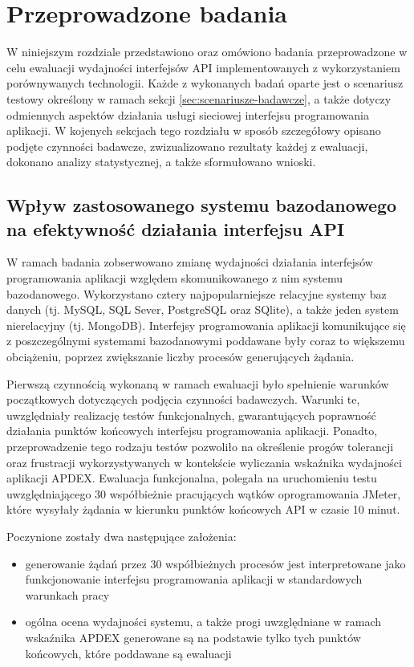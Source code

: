 \chapter{Przeprowadzone badania}
W niniejszym rozdziale przedstawiono oraz omówiono badania przeprowadzone w celu ewaluacji wydajności interfejsów API implementowanych z wykorzystaniem porównywanych technologii. Każde z wykonanych badań oparte jest o scenariusz testowy określony w ramach sekcji \ref{sec:scenariusze-badawcze}, a także dotyczy odmiennych aspektów działania usługi sieciowej interfejsu programowania aplikacji. W kojenych sekcjach tego rozdziału w sposób szczegółowy opisano podjęte czynności badawcze, zwizualizowano rezultaty każdej z ewaluacji, dokonano analizy statystycznej, a także sformułowano wnioski.

\section{Wpływ zastosowanego systemu bazodanowego na efektywność działania interfejsu API}
W ramach badania zobserwowano zmianę wydajności działania interfejsów programowania aplikacji względem skomunikowanego z nim systemu bazodanowego. Wykorzystano cztery najpopularniejsze relacyjne systemy baz danych (tj. MySQL, SQL Sever, PostgreSQL oraz SQlite), a także jeden system nierelacyjny (tj. MongoDB). Interfejsy programowania aplikacji komunikujące się z poszczególnymi systemami bazodanowymi poddawane były coraz to większemu obciążeniu, poprzez zwiększanie liczby procesów generujących żądania.

Pierwszą czynnością wykonaną w ramach ewaluacji było spełnienie warunków początkowych dotyczących podjęcia czynności badawczych. Warunki te, uwzględniały realizację testów funkcjonalnych, gwarantujących poprawność działania punktów końcowych interfejsu programowania aplikacji. Ponadto, przeprowadzenie tego rodzaju testów pozwoliło na określenie progów tolerancji oraz frustracji wykorzystywanych w kontekście wyliczania wskaźnika wydajności aplikacji APDEX. Ewaluacja funkcjonalna, polegała na uruchomieniu testu uwzględniającego 30 współbieżnie pracujących wątków oprogramowania JMeter, które wysyłały żądania w kierunku punktów końcowych API w czasie 10 minut.

Poczynione zostały dwa następujące założenia:
\begin{itemize}
    \item generowanie żądań przez 30 współbieżnych procesów jest interpretowane jako funkcjonowanie interfejsu programowania aplikacji w standardowych warunkach pracy
    \item ogólna ocena wydajności systemu, a także progi uwzględniane w ramach wskaźnika APDEX generowane są na podstawie tylko tych punktów końcowych, które poddawane są ewaluacji
\end{itemize}

